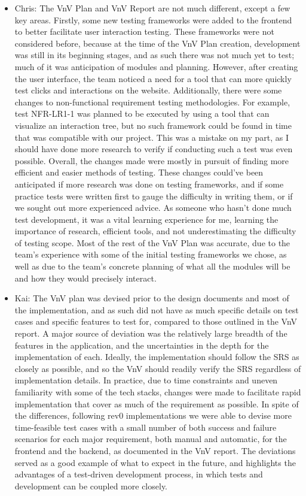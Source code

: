 \documentclass[12pt, titlepage]{article}
\begin{document}
\begin{itemize}
    \item Chris: The VnV Plan and VnV Report are not much different, except a few key areas. Firstly, some new testing frameworks were added to the frontend to better facilitate user interaction testing. These frameworks were not considered before, because at the time of the VnV Plan creation, development was still in its beginning stages, and as such there was not much yet to test; much of it was anticipation of modules and planning. However, after creating the user interface, the team noticed a need for a tool that can more quickly test clicks and interactions on the website. Additionally, there were some changes to non-functional requirement testing methodologies. For example, test NFR-LR1-1 was planned to be executed by using a tool that can visualize an interaction tree, but no such framework could be found in time that was compatible with our project. This was a mistake on my part, as I should have done more research to verify if conducting such a test was even possible. Overall, the changes made were mostly in pursuit of finding more efficient and easier methods of testing. These changes could've been anticipated if more research was done on testing frameworks, and if some practice tests were written first to gauge the difficulty in writing them, or if we sought out more experienced advice. As someone who hasn't done much test development, it was a vital learning experience for me, learning the importance of research, efficient tools, and not underestimating the difficulty of testing scope. Most of the rest of the VnV Plan was accurate, due to the team's experience with some of the initial testing frameworks we chose, as well as due to the team's concrete planning of what all the modules will be and how they would precisely interact.

    \item Kai: The VnV plan was devised prior to the design documents and most of the implementation, and as such did not have as much specific details on test cases and specific features to test for, compared to those outlined in the VnV report. A major source of deviation was the relatively large breadth of the features in the application, and the uncertainties in the depth for the implementation of each. Ideally, the implementation should follow the SRS as closely as possible, and so the VnV should readily verify the SRS regardless of implementation details. In practice, due to time constraints and uneven familiarity with some of the tech stacks, changes were made to facilitate rapid implementation that cover as much of the requirement as possible. In spite of the differences, following rev0 implementations we were able to devise more time-feasible test cases with a small number of both success and failure scenarios for each major requirement, both manual and automatic, for the frontend and the backend, as documented in the VnV report. The deviations served as a good example of what to expect in the future, and highlights the advantages of a test-driven development process, in which tests and development can be coupled more closely.


\end{itemize}
\end{document}
